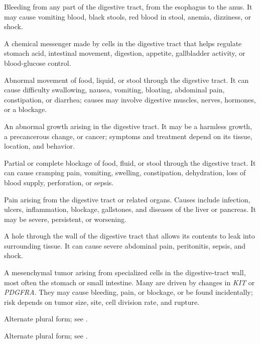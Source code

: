  Bleeding from any part of the digestive tract, from the esophagus to the anus. It may cause vomiting blood, black stools, red blood in stool, anemia, dizziness, or shock.

 A chemical messenger made by cells in the digestive tract that helps regulate stomach acid, intestinal movement, digestion, appetite, gallbladder activity, or blood-glucose control.

 Abnormal movement of food, liquid, or stool through the digestive tract. It can cause difficulty swallowing, nausea, vomiting, bloating, abdominal pain, constipation, or diarrhea; causes may involve digestive muscles, nerves, hormones, or a blockage.

 An abnormal growth arising in the digestive tract. It may be a harmless growth, a precancerous change, or cancer; symptoms and treatment depend on its tissue, location, and behavior.

 Partial or complete blockage of food, fluid, or stool through the digestive tract. It can cause cramping pain, vomiting, swelling, constipation, dehydration, loss of blood supply, perforation, or sepsis.

 Pain arising from the digestive tract or related organs. Causes include infection, ulcers, inflammation, blockage, gallstones, and diseases of the liver or pancreas. It may be severe, persistent, or worsening.

 A hole through the wall of the digestive tract that allows its contents to leak into surrounding tissue. It can cause severe abdominal pain, peritonitis, sepsis, and shock.

 A mesenchymal tumor arising from specialized cells in the digestive-tract wall, most often the stomach or small intestine. Many are driven by changes in \textit{KIT} or \textit{PDGFRA}. They may cause bleeding, pain, or blockage, or be found incidentally; risk depends on tumor size, site, cell division rate, and rupture.

 Alternate plural form; see .

 Alternate plural form; see .

